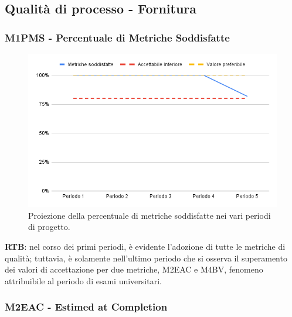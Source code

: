 \subsection{Qualità di processo - Fornitura}

\vspace{0.3cm}

\subsubsection{M1PMS - Percentuale di Metriche Soddisfatte}
\begin{figure}[H]
    \centering
    \includegraphics[width=1\textwidth]{../Images/PianoDiQualifica/M1PMS.png}
    \caption{Proiezione della percentuale di metriche soddisfatte nei vari periodi di progetto.}
    \label{fig:1}
\end{figure}

\vspace{0.2cm}

\textbf{RTB}: nel corso dei primi periodi, è evidente l'adozione di tutte le metriche di qualità; tuttavia, è solamente nell'ultimo periodo che si osserva il superamento dei valori di accettazione per due metriche, M2EAC e M4BV, fenomeno attribuibile al periodo di esami universitari.

\subsubsection{M2EAC - Estimed at Completion}

\vspace{0.3cm}


